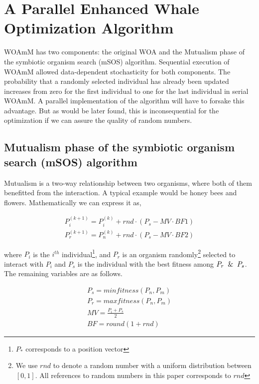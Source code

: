 \documentclass[conference]{IEEEtran}
\begin{document}
\section{A Parallel Enhanced Whale Optimization Algorithm}

WOAmM has two components: 
the original WOA and the Mutualism phase of the symbiotic organism search (mSOS) algorithm. 
Sequential execution of WOAmM allowed data-dependent stochasticity for both components. 
The probability that a randomly selected individual has already been updated increases from zero for the first individual to one for the last individual in serial WOAmM. 
A parallel implementation of the algorithm will have to forsake this advantage. 
But as would be later found, this is inconsequential for the optimization if we can assure the quality of random numbers.

\subsection{Mutualism phase of the symbiotic organism search (mSOS) algorithm}

Mutualism is a two-way relationship between two organisms, where both of them benefitted from the interaction. 
A typical example would be honey bees and flowers. 
Mathematically we can express it as,

\setlength{\arraycolsep}{0.0em}
\begin{eqnarray}
    P^{(k+1)}_i= P^{(k)}_i+rnd\cdot(P_s - MV\cdot BF1)\\
    P^{(k+1)}_r= P^{(k)}_n+rnd\cdot(P_s - MV\cdot BF2)
\end{eqnarray}
\setlength{\arraycolsep}{0pt}

where $P_i$ is the $i^{th}$ individual\footnote{$P_*$ corresponds to a position vector}, and $P_r$ is an organism randomly\footnote{We use $rnd$ to denote a random number with a uniform distribution between $[0, 1]$. All references to random numbers in this paper corresponds to $rnd$} selected to interact with $P_i$ and $P_s$ is the individual with the best fitness among $P_r \And P_s$. 
The remaining variables are as follows.

\setlength{\arraycolsep}{0em}
\begin{eqnarray}
    P_s=min fitness(P_n,P_m) \\
    P_r=max fitness(P_n,P_m) \\
    MV = \frac{P_i+P_s}{2} \\
    BF = round(1+rnd)
\end{eqnarray}
\setlength{\arraycolsep}{0pt}
\end{document}
